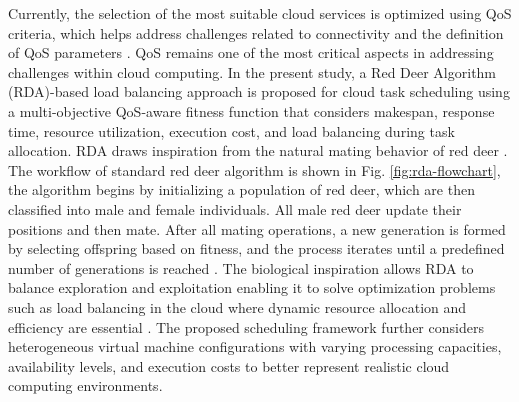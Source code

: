 \documentclass[pdflatex,sn-mathphys-num]{sn-jnl}%
\begin{document}
Currently, the selection of the most suitable cloud services is optimized using QoS criteria, which helps address challenges related to connectivity and the definition of QoS parameters \cite{QoS}. QoS remains one of the most critical aspects in addressing challenges within cloud computing. In the present study, a Red Deer Algorithm (RDA)-based load balancing approach is proposed for cloud task scheduling using a multi-objective QoS-aware fitness function that considers makespan, response time, resource utilization, execution cost, and load balancing during task allocation. RDA draws inspiration from the natural mating behavior of red deer \cite{red_deer}. The workflow of standard red deer algorithm is shown in Fig. \ref{fig:rda-flowchart}, the algorithm begins by initializing a population of red deer, which are then classified into male and female individuals. All male red deer update their positions and then mate. After all mating operations, a new generation is formed by selecting offspring based on fitness, and the process iterates until a predefined number of generations is reached \cite{red_deer}. The biological inspiration allows RDA to balance exploration and exploitation enabling it to solve optimization problems such as load balancing in the cloud where dynamic resource allocation and efficiency are essential \cite{red_deer_Pradhan2022}. The proposed scheduling framework further considers heterogeneous virtual machine configurations with varying processing capacities, availability levels, and execution costs to better represent realistic cloud computing environments. 
\end{document}
